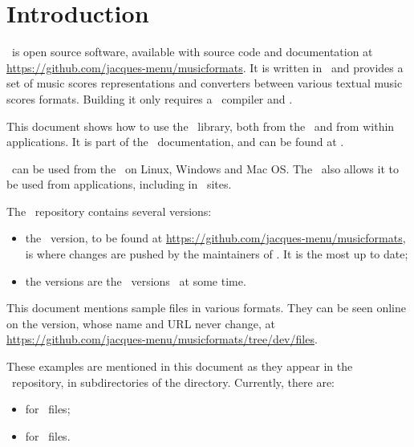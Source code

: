 
\chapter{Introduction}

\mf\ is open source software, available with source code and documentation at \url{https://github.com/jacques-menu/musicformats}. It is written in \CPlusplus\ and provides a set of music scores representations and converters between various textual music scores formats. Building it only requires a \CPlusplus\ compiler and \cmake.

This document shows how to use the \mf\ library, both from the \CLI\ and from within applications. It is part of the \mf\ documentation, and can be found at .

\mf\ can be used from the \CLI\ on Linux, Windows and Mac OS. The \API\ also allows it to be used from applications, including in \Web\ sites.

The \mf\ repository contains several versions:
\begin{itemize}
\item the  \master\ version, to be found at \url{https://github.com/jacques-menu/musicformats}, is where changes are pushed by the maintainers of \mf. It is the most up to date;
\item the  versions are the \master\ versions \frozen\ at some time.
\end{itemize}

This document mentions sample files in various formats. They can be seen online on the  version, whose name and URL never change, at \url{https://github.com/jacques-menu/musicformats/tree/dev/files}.

These examples are mentioned in this document as they appear in the \mf\ repository, in subdirectories of the  directory. Currently, there are:
\begin{itemize}
\item {} for \mxml\ files;
\item {} for \msdlLang\ files.
\end{itemize}

